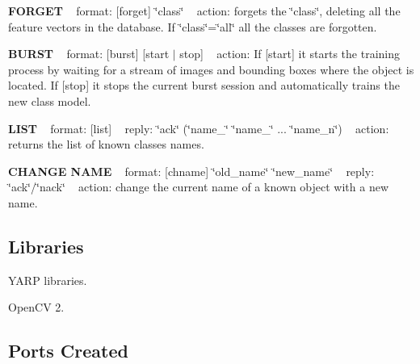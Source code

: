 {\bfseries{F\+O\+R\+G\+ET}} ~\newline
format\+: \mbox{[}forget\mbox{]} \char`\"{}class\char`\"{} ~\newline
action\+: forgets the \char`\"{}class\char`\"{}, deleting all the feature vectors in the database. If \char`\"{}class\char`\"{}=\char`\"{}all\char`\"{} all the classes are forgotten.

{\bfseries{B\+U\+R\+ST}} ~\newline
format\+: \mbox{[}burst\mbox{]} \mbox{[}start $\vert$ stop\mbox{]} ~\newline
action\+: If \mbox{[}start\mbox{]} it starts the training process by waiting for a stream of images and bounding boxes where the object is located. If \mbox{[}stop\mbox{]} it stops the current burst session and automatically trains the new class model.

{\bfseries{L\+I\+ST}} ~\newline
format\+: \mbox{[}list\mbox{]} ~\newline
reply\+: \char`\"{}ack\char`\"{} (\char`\"{}name\+\_\char`\"{} \char`\"{}name\+\_\char`\"{} ... \char`\"{}name\+\_\+n\char`\"{}) ~\newline
action\+: returns the list of known classes names.

{\bfseries{C\+H\+A\+N\+GE N\+A\+ME}} ~\newline
format\+: \mbox{[}chname\mbox{]} \char`\"{}old\+\_\+name\char`\"{} \char`\"{}new\+\_\+name\char`\"{} ~\newline
reply\+: \char`\"{}ack\char`\"{}/\char`\"{}nack\char`\"{} ~\newline
action\+: change the current name of a known object with a new name.\hypertarget{group__icub__iolStateMachineHandler_lib_sec}{}\subsection{Libraries}\label{group__icub__iolStateMachineHandler_lib_sec}

\begin{DoxyItemize}
\item Y\+A\+RP libraries.
\item Open\+CV 2.
\end{DoxyItemize}\hypertarget{group__icub__iolStateMachineHandler_portsc_sec}{}\subsection{Ports Created}\label{group__icub__iolStateMachineHandler_portsc_sec}

